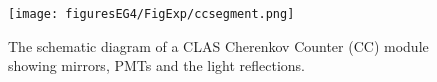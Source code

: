 \begin{figure}[h] %
\centering
\leavevmode \texttt{[image: figuresEG4/FigExp/ccsegment.png]}  %
\caption[A Cherenkov Counter module]{The schematic diagram of a CLAS Cherenkov Counter (CC) module showing mirrors, PMTs and the light reflections. %
}
\label{figccunit}%
\end{figure}







